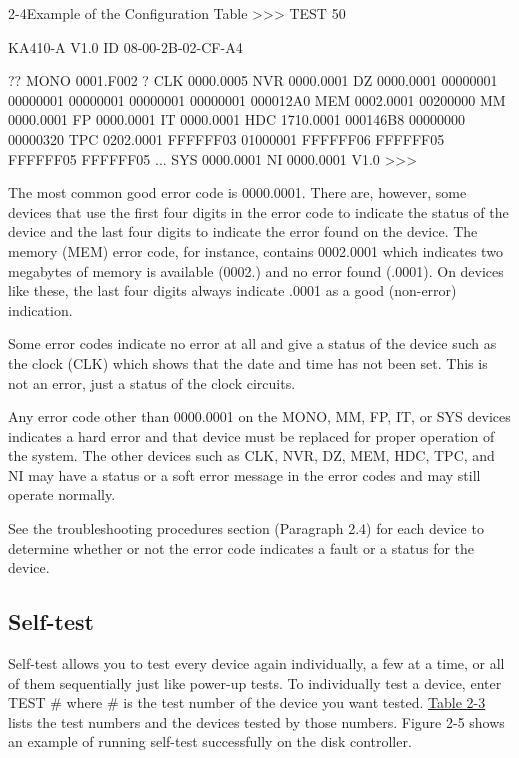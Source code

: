\begin{ttfig}{2-4}{Example of the Configuration Table}
>>> TEST 50

KA410-A V1.0
ID 08-00-2B-02-CF-A4

?? MONO       0001.F002
 ? CLK        0000.0005
   NVR        0000.0001
   DZ         0000.0001
       00000001 00000001 00000001 00000001 00000001 000012A0
   MEM        0002.0001
       00200000
   MM         0000.0001
   FP         0000.0001
   IT         0000.0001
   HDC        1710.0001
       000146B8 00000000 00000320
   TPC        0202.0001
       FFFFFF03 01000001 FFFFFF06 FFFFFF05 FFFFFF05 FFFFFF05 ...
   SYS        0000.0001
   NI         0000.0001 V1.0
>>>
\end{ttfig}
\newpage
The most common good error code is 0000.0001. There are, however, some
devices that use the first four digits in the error code to indicate the status
of the device and the last four digits to indicate the error found on the
device. The memory (MEM) error code, for instance, contains 0002.0001
which indicates two megabytes of memory is available (0002.) and no error
found (.0001). On devices like these, the last four digits always indicate
.0001 as a good (non-error) indication.

Some error codes indicate no error at all and give a status of the device
such as the clock (CLK) which shows that the date and time has not been
set. This is not an error, just a status of the clock circuits.

Any error code other than 0000.0001 on the MONO, MM, FP, IT, or SYS
devices indicates a hard error and that device must be replaced for proper
operation of the system. The other devices such as CLK, NVR, DZ, MEM,
HDC, TPC, and NI may have a status or a soft error message in the error
codes and may still operate normally.

See the troubleshooting procedures section (Paragraph 2.4) for each device
to determine whether or not the error code indicates a fault or a status for
the device.

\subsection{Self-test}

Self-test allows you to test every device again individually, a few at a time,
or all of them sequentially just like power-up tests. To individually test a
device, enter TEST \# where \# is the test number of the device you want
tested. \hyperref[table:2-3]{Table 2-3} lists the test numbers and the devices tested by those
numbers. Figure 2-5 shows an example of running self-test successfully on
the disk controller.

